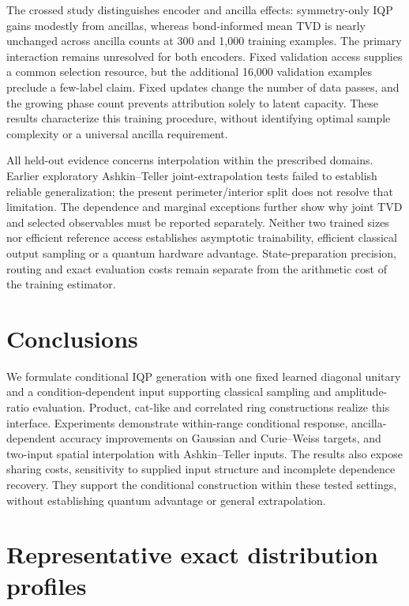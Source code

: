 \documentclass[pra,aps,10pt,twocolumn,floatfix,superscriptaddress,
notitlepage,longbibliography]{revtex4-2}
\begin{document}
The crossed study distinguishes encoder and ancilla effects: symmetry-only IQP gains modestly from ancillas, whereas bond-informed mean TVD is nearly unchanged across ancilla counts at 300 and 1,000 training examples. The primary interaction remains unresolved for both encoders. Fixed validation access supplies a common selection resource, but the additional 16,000 validation examples preclude a few-label claim. Fixed updates change the number of data passes, and the growing phase count prevents attribution solely to latent capacity. These results characterize this training procedure, without identifying optimal sample complexity or a universal ancilla requirement.

All held-out evidence concerns interpolation within the prescribed domains. Earlier exploratory Ashkin--Teller joint-extrapolation tests failed to establish reliable generalization; the present perimeter/interior split does not resolve that limitation. The dependence and marginal exceptions further show why joint TVD and selected observables must be reported separately. Neither two trained sizes nor efficient reference access establishes asymptotic trainability, efficient classical output sampling or a quantum hardware advantage. State-preparation precision, routing and exact evaluation costs remain separate from the arithmetic cost of the training estimator.

\section{Conclusions}
We formulate conditional IQP generation with one fixed learned diagonal unitary and a condition-dependent input supporting classical sampling and amplitude-ratio evaluation. Product, cat-like and correlated ring constructions realize this interface. Experiments demonstrate within-range conditional response, ancilla-dependent accuracy improvements on Gaussian and Curie--Weiss targets, and two-input spatial interpolation with Ashkin--Teller inputs. The results also expose sharing costs, sensitivity to supplied input structure and incomplete dependence recovery. They support the conditional construction within these tested settings, without establishing quantum advantage or general extrapolation.

\clearpage
\appendix
\section{Representative exact distribution profiles}
\label{app:qualitative-profiles}
\end{document}

